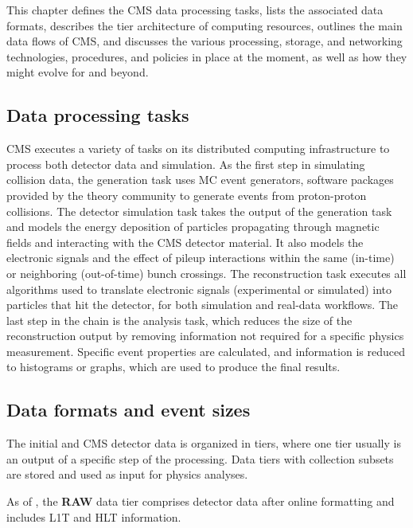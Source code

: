 This chapter defines the CMS data processing tasks, lists the associated data formats, describes the tier architecture of computing resources, outlines the main data flows of CMS, and discusses the various processing, storage, and networking technologies, procedures, and policies in place at the moment, as well as how they might evolve for \RunFour and beyond.

\subsection{Data processing tasks}
\label{sec:processing tasks}

CMS executes a variety of tasks on its distributed computing infrastructure to process both detector data and simulation. 
As the first step in simulating collision data, the generation task uses \gls{MC} event generators, software
packages provided by the theory community to generate events from proton-proton collisions.
The detector simulation task takes the output of the generation task and models the energy deposition of particles propagating through magnetic fields and interacting with the CMS detector material. It also models the electronic signals and the effect of pileup interactions within the same (in-time) or neighboring (out-of-time) bunch crossings. 
The reconstruction task executes all algorithms used to translate electronic signals (experimental or simulated) into particles that hit the detector, for both simulation and real-data workflows.
The last step in the chain is the analysis task, which reduces the size of the reconstruction output by removing information not required for a specific physics measurement. Specific event properties are calculated, and information is reduced to histograms or graphs, which are used to produce the final results. 

\subsection{Data formats and event sizes}
\label{sec:dataformats}


The initial and \PhaseOne CMS detector data is organized in tiers, where one tier usually is an output of a specific step of the processing. Data tiers with collection subsets are stored and used as input for physics analyses. 

As of \RunThree, the \textbf{RAW} data tier comprises detector data after online formatting and includes \gls{L1T} and \gls{HLT} information. 

